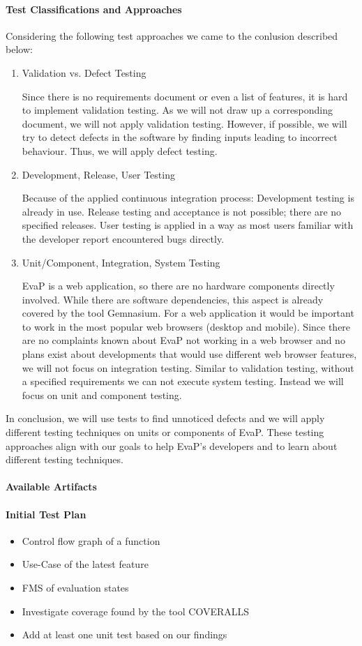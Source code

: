 \paragraph{Test Classifications and Approaches}
Considering the following test approaches we came to the conlusion described below:
\begin{enumerate}
    \item Validation vs. Defect Testing
    
    Since there is no requirements document or even a list of features, it is hard to implement validation testing. As we will not draw up a corresponding document, we will not apply validation testing. However, if possible, we will try to detect defects in the software by finding inputs leading to incorrect behaviour. Thus, we will apply defect testing.
    \item Development, Release, User Testing 
    
    Because of the applied continuous integration process: Development testing is already in use. Release testing and acceptance is not possible; there are no specified releases. User testing is applied in a way as most users familiar with the developer report encountered bugs directly.
    \item Unit/Component, Integration, System Testing
    
    EvaP is a web application, so there are no hardware components directly involved. While there are software dependencies, this aspect is already covered by the tool Gemnasium. For a web application it would be important to work in the most popular web browsers (desktop and mobile). Since there are no complaints known about EvaP not working in a web browser and no plans exist about developments that would use different web browser features, we will not focus on integration testing. Similar to validation testing, without a specified requirements we can not execute system testing. Instead we will focus on unit and component testing. 
\end{enumerate}
In conclusion, we will use tests to find unnoticed defects and we will apply different testing techniques on units or components of EvaP. These testing approaches align with our goals to help EvaP's developers and to learn about different testing techniques.

\paragraph{Available Artifacts}

\paragraph{Initial Test Plan}
\begin{itemize}
    \item Control flow graph of a function
    \item Use-Case of the latest feature
    \item FMS of evaluation states
    \item Investigate coverage found by the tool COVERALLS
    \item Add at least one unit test based on our findings
\end{itemize}
